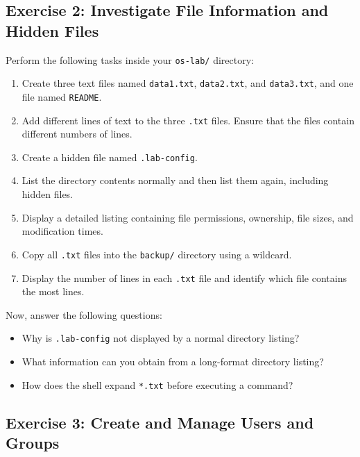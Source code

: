 \subsection{Exercise 2: Investigate File Information and Hidden Files}
Perform the following tasks inside your \texttt{os-lab/} directory:
\begin{enumerate}
	\item Create three text files named \texttt{data1.txt}, \texttt{data2.txt}, and \texttt{data3.txt}, and one file named \texttt{README}.
	\item Add different lines of text to the three \texttt{.txt} files. Ensure that the files contain different numbers of lines.
	\item Create a hidden file named \texttt{.lab-config}. \item List the directory contents normally and then list them again, including hidden files.
	\item Display a detailed listing containing file permissions, ownership, file sizes, and modification times.
	\item Copy all \texttt{.txt} files into the \texttt{backup/} directory using a wildcard.
	\item Display the number of lines in each \texttt{.txt} file and identify which file contains the most lines. \end{enumerate}
	
Now, answer the following questions:
\begin{itemize}
	\item Why is \texttt{.lab-config} not displayed by a normal directory listing?
	\item What information can you obtain from a long-format directory listing?
	\item How does the shell expand \texttt{*.txt} before executing a command?
\end{itemize}

\subsection{Exercise 3: Create and Manage Users and Groups}

